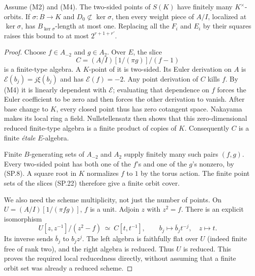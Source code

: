 \begin{lemma}
\label{claim:SP4}
Assume (M2) and (M4).  The two-sided points of $S(K)$ have finitely
many $K^\times$-orbits.  If $\sigma:B\to K$ and
$D_0\not\subset\ker\sigma$, then every weight piece of $A/I$,
localized at $\ker\sigma$, has $B_{\ker\sigma}$-length at most one.
Replacing all the $F_i$ and $E_i$ by their squares raises this bound
to at most $2^{r+1+r'}$.
\end{lemma}

\begin{proof}
Choose $f\in A_{-2}$ and $g\in A_2$.  Over $E$, the slice
\[
                   C=(A/I)[1/(\pi g)]/(f-1)
 \tag{SP.22}
\]
is a finite-type algebra.  A $K$-point of it is two-sided.  Its Euler
derivation on $A$ is $\mathcal E(b_j)=j\xi(b_j)$ and has
$\mathcal E(f)=-2$.  Any point derivation of $C$ kills $f$.
By (M4) it is linearly dependent with $\mathcal E$; evaluating that
dependence on $f$ forces the Euler coefficient to be zero and then
forces the other derivation to vanish.  After base change to $K$,
every closed point thus has zero cotangent space.  Nakayama makes
its local ring a field.  Nullstellensatz then shows that this
zero-dimensional reduced finite-type algebra is a finite product
of copies of $K$.  Consequently $C$ is a finite \emph{\'etale}
$E$-algebra.

Finite $B$-generating sets of $A_{-2}$ and $A_2$ supply finitely many
such pairs $(f,g)$.  Every two-sided point has both one of the $f$'s
and one of the $g$'s nonzero, by (SP.8).  A square root in $K$
normalizes $f$ to $1$ by the torus action.  The finite point sets of
the slices (SP.22) therefore give a finite orbit cover.

We also need the scheme multiplicity, not just the number of points.
On $U=(A/I)[1/(\pi fg)]$, $f$ is a unit.  Adjoin $z$ with
$z^2=f$.  There is an explicit isomorphism
\[
 U[z,z^{-1}]/(z^2-f)\ \simeq\ C[t,t^{-1}],
 \qquad b_j\longmapsto\overline b_jt^{-j},\quad z\longmapsto t.
 \tag{SP.23}
\]
Its inverse sends $\overline b_j$ to $b_jz^j$.
The left algebra is faithfully flat over $U$ (indeed finite free of
rank two), and the right algebra is reduced.  Thus $U$ is reduced.
This proves the required local reducedness directly, without
assuming that a finite orbit set was already a reduced scheme.


\end{proof}
